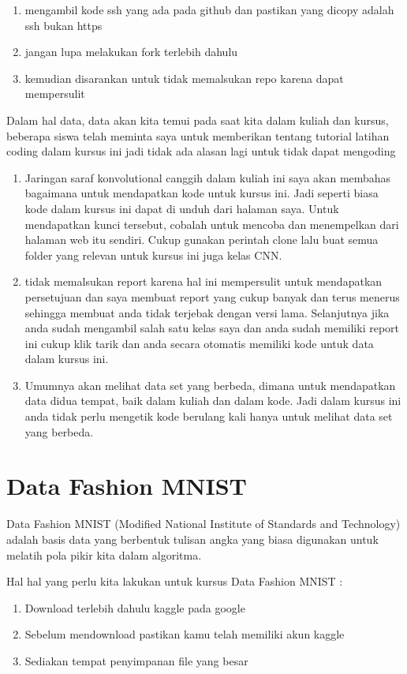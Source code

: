 \begin{enumerate}
\item mengambil kode ssh yang ada pada github dan pastikan yang dicopy adalah ssh bukan https
\item jangan lupa melakukan fork terlebih dahulu
\item kemudian disarankan untuk tidak memalsukan repo karena dapat mempersulit 
\end{enumerate}

Dalam hal data, data akan kita temui pada saat kita dalam kuliah dan kursus, beberapa siswa telah meminta saya untuk memberikan 
tentang tutorial latihan coding dalam kursus ini jadi tidak ada alasan lagi untuk tidak dapat mengoding

\begin{enumerate}
\item Jaringan saraf konvolutional canggih dalam kuliah ini saya akan membahas bagaimana untuk mendapatkan kode untuk kursus ini. Jadi seperti biasa kode dalam kursus ini dapat di unduh dari halaman saya. Untuk mendapatkan kunci tersebut, cobalah untuk mencoba dan menempelkan dari halaman web itu sendiri. Cukup gunakan perintah clone lalu buat semua folder yang relevan untuk kursus ini juga kelas CNN.
\item tidak memalsukan report karena hal ini mempersulit untuk mendapatkan persetujuan dan saya membuat report yang cukup banyak dan terus menerus sehingga membuat anda tidak terjebak dengan versi lama. Selanjutnya jika anda sudah mengambil salah satu kelas saya dan anda sudah memiliki report ini cukup klik tarik dan anda secara otomatis memiliki kode untuk data dalam kursus ini.
\item Umumnya akan melihat data set yang berbeda, dimana untuk mendapatkan data didua tempat, baik dalam kuliah dan dalam kode. Jadi dalam kursus ini anda tidak perlu mengetik kode berulang kali hanya untuk melihat data set yang berbeda. 

\end{enumerate}

\section{Data Fashion MNIST}
Data Fashion MNIST (Modified National Institute of Standards and Technology) adalah basis data yang berbentuk tulisan angka yang biasa digunakan untuk melatih pola pikir kita dalam algoritma.

Hal hal yang perlu kita lakukan untuk kursus Data Fashion MNIST :
\begin{enumerate}
\item Download terlebih dahulu kaggle pada google
\item Sebelum mendownload pastikan kamu telah memiliki akun kaggle 
\item Sediakan tempat penyimpanan file yang besar
\end{enumerate}

